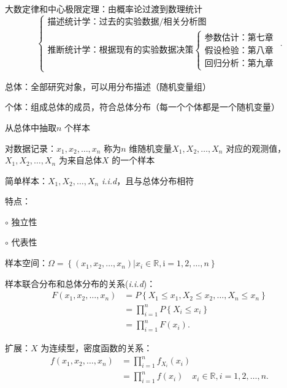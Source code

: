 大数定律和中心极限定理：由概率论过渡到数理统计
\[
    \begin{cases}
        \text{描述统计学：过去的实验数据/相关分析图}\\
        \text{推断统计学：根据现有的实验数据决策}\begin{cases}
            \text{参数估计：第七章}\\
            \text{假设检验：第八章}\\
            \text{回归分析：第九章}
        \end{cases}
    \end{cases}
.\] 
\begin{defi}
    总体：全部研究对象，可以用分布描述（随机变量组）
\end{defi}
\begin{defi}
    个体：组成总体的成员，符合总体分布（每一个个体都是一个随机变量）
\end{defi}
\begin{eg}
    从总体中抽取$n$ 个样本

    对数据记录：$x_1,x_2,\ldots ,x_n$ 称为$n$ 维随机变量$X_1,X_2,\ldots ,X_n$ 对应的观测值，$X_1,X_2,\ldots ,X_n$ 为来自总体$X$ 的一个样本
\end{eg}
\begin{notation}
    简单样本：$X_1,X_2,\ldots ,X_n$ \textit{i.i.d}，且与总体分布相符 

    特点：

    $\circ$ 独立性

    $\circ$ 代表性
\end{notation}
\begin{defi}
    样本空间：$\bm{\varOmega}=\left\{ \left( x_1,x_2,\ldots ,x_n \right) |x_i\in \mathbb{R},\mathrm{i}=1,2,\ldots ,n \right\} $
\end{defi}
\begin{notation}
    样本联合分布和总体分布的关系(\textit{i.i.d})：
    \begin{align*}
        F\left( x_1,x_2,\ldots ,x_n \right) &=P\left\{ X_1\le x_1,X_2\le x_2,\ldots ,X_n\le x_n \right\} \\
        &=\prod_{i=1}^{n} P\left\{ X_i\le x_i \right\} \\
        &= \prod_{i=1}^{n} F\left( x_i \right) 
    .\end{align*}
\end{notation}
扩展：$X$ 为连续型，密度函数的关系：
\begin{align*}
    f\left( x_1,x_2,\ldots ,x_n \right) &= \prod_{i=1}^{n} f_{X_i}\left( x_i \right)   \\
    &= \prod_{i=1}^{n} f\left( x_i \right) \quad x_i\in \mathbb{R},i=1,2,\ldots ,n
.\end{align*}
